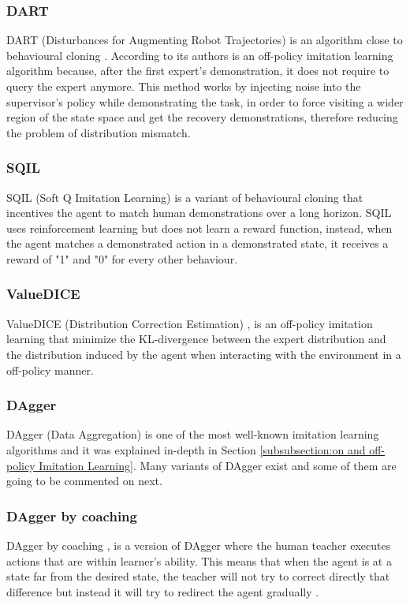 \subsubsection*{DART}
DART (Disturbances for Augmenting Robot Trajectories) \cite{DART-Laskey:2017} is an algorithm close to behavioural cloning \cite{Behavioural-Cloning-Pomerleau:1991}. According to its authors is an off-policy imitation learning algorithm because, after the first expert's demonstration, it does not require to query the expert anymore. This method works by injecting noise into the supervisor's policy while demonstrating the task, in order to force visiting a wider region of the state space and get the recovery demonstrations, therefore reducing the problem of distribution mismatch.

\subsubsection*{SQIL}
SQIL (Soft Q Imitation Learning) \cite{SQIL-Reddy-Dragan-Levine:2019} is a variant of behavioural cloning that incentives the agent to match human demonstrations over a long horizon. SQIL uses reinforcement learning but does not learn a reward function, instead, when the agent matches a demonstrated action in a demonstrated state, it receives a reward of "1" and "0" for every other behaviour.

\subsubsection*{ValueDICE}
ValueDICE (Distribution Correction Estimation) \cite{ValueDICE-Kostrikov:2019}, is an off-policy imitation learning \cite{Laskey:phdthesis} that minimize the KL-divergence between the expert distribution and the distribution induced by the agent when interacting with the environment in a off-policy manner.


\subsubsection*{DAgger}
DAgger (Data Aggregation) \cite{DAgger-Ross:2011} is one of the most well-known imitation learning algorithms and it was explained in-depth in Section \ref{subsubsection:on and off-policy Imitation Learning}. Many variants of DAgger exist and some of them are going to be commented on next.



\subsubsection*{DAgger by coaching}
DAgger by coaching \cite{DAgger-by-coaching-He-DaumeIII-Eisner:2012},  is a version of DAgger \cite{DAgger-Ross:2011} where the human teacher executes actions that are within learner’s ability. This means that when the agent is at a state far from the desired state, the teacher will not try to correct directly that difference but instead it will try to redirect the agent gradually \cite{Global-overview-Attia:2018}.


